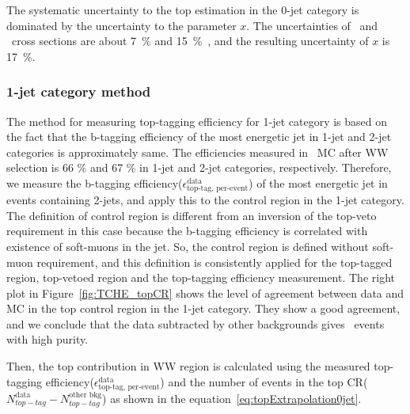 The systematic uncertainty to the top estimation in the 0-jet category 
is dominated by the uncertainty to the parameter $x$. The uncertainties
of \ttbar\ and \tw\ cross sections are about 7~\% and 15~\%~\cite{Kidonakis:2012rm}, 
and the resulting uncertainty of $x$ is 17~\%. 

\subsubsection{1-jet category method}

The method for measuring top-tagging efficiency for 1-jet category is 
based on the fact that the b-tagging efficiency of the most energetic jet 
in 1-jet and 2-jet categories is approximately same. The efficiencies 
measured in \ttbar\ MC after WW selection is 66 \% and 67 \% in 1-jet 
and 2-jet categories, respectively. Therefore, we measure the b-tagging 
efficiency($\epsilon_{\textrm{top-tag, per-event}}^{\textrm{data}}$) 
of the most energetic jet in events containing 2-jets,
and apply this to the control region in the 1-jet category.  
The definition of control region is different from an inversion of 
the top-veto requirement in this case because the b-tagging efficiency 
is correlated with existence of soft-muons in the jet. 
So, the control region is defined without soft-muon requirement, 
and this definition is consistently applied for the top-tagged region, 
top-vetoed region and the top-tagging efficiency measurement.
The right plot in Figure~\ref{fig:TCHE_topCR} shows the level of agreement between 
data and MC in the top control region in the 1-jet category.  
They show a good agreement, and we conclude that the data subtracted by other backgrounds 
gives \topbkg\ events with high purity. 

Then, the top contribution in WW region is calculated using the measured
top-tagging efficiency($\epsilon_{\textrm{top-tag, per-event}}^{\textrm{data}}$) 
and the number of events in the top CR($N_{top-tag}^{\textrm{data}}
-N_{top-tag}^{\textrm{other bkg}}$) as shown in the equation~\ref{eq:topExtrapolation0jet}.

